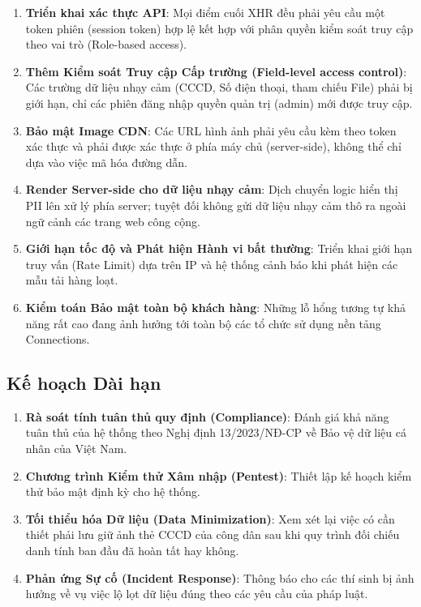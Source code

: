 \documentclass[12pt,a4paper]{article}
\begin{document}
\begin{enumerate}
    \item \textbf{Triển khai xác thực API}: Mọi điểm cuối XHR đều phải yêu cầu một token phiên (session token) hợp lệ kết hợp với phân quyền kiểm soát truy cập theo vai trò (Role-based access).
    \item \textbf{Thêm Kiểm soát Truy cập Cấp trường (Field-level access control)}: Các trường dữ liệu nhạy cảm (CCCD, Số điện thoại, tham chiếu File) phải bị giới hạn, chỉ các phiên đăng nhập quyền quản trị (admin) mới được truy cập.
    \item \textbf{Bảo mật Image CDN}: Các URL hình ảnh phải yêu cầu kèm theo token xác thực và phải được xác thực ở phía máy chủ (server-side), không thể chỉ dựa vào việc mã hóa đường dẫn.
    \item \textbf{Render Server-side cho dữ liệu nhạy cảm}: Dịch chuyển logic hiển thị PII lên xử lý phía server; tuyệt đối không gửi dữ liệu nhạy cảm thô ra ngoài ngữ cảnh các trang web công cộng.
    \item \textbf{Giới hạn tốc độ và Phát hiện Hành vi bất thường}: Triển khai giới hạn truy vấn (Rate Limit) dựa trên IP và hệ thống cảnh báo khi phát hiện các mẫu tải hàng loạt.
    \item \textbf{Kiểm toán Bảo mật toàn bộ khách hàng}: Những lỗ hổng tương tự khả năng rất cao đang ảnh hưởng tới toàn bộ các tổ chức sử dụng nền tảng Connections.
\end{enumerate}

\subsection{Kế hoạch Dài hạn}

\begin{enumerate}
    \item \textbf{Rà soát tính tuân thủ quy định (Compliance)}: Đánh giá khả năng tuân thủ của hệ thống theo Nghị định 13/2023/NĐ-CP về Bảo vệ dữ liệu cá nhân của Việt Nam.
    \item \textbf{Chương trình Kiểm thử Xâm nhập (Pentest)}: Thiết lập kế hoạch kiểm thử bảo mật định kỳ cho hệ thống.
    \item \textbf{Tối thiểu hóa Dữ liệu (Data Minimization)}: Xem xét lại việc có cần thiết phải lưu giữ ảnh thẻ CCCD của công dân sau khi quy trình đối chiếu danh tính ban đầu đã hoàn tất hay không.
    \item \textbf{Phản ứng Sự cố (Incident Response)}: Thông báo cho các thí sinh bị ảnh hưởng về vụ việc lộ lọt dữ liệu đúng theo các yêu cầu của pháp luật.
\end{enumerate}
\end{document}
